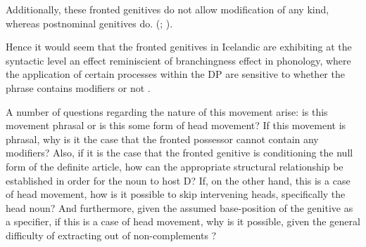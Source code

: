 \documentclass[output=paper,colorlinks,citecolor=brown,
]{langscibook}
\begin{document}
 Additionally, these fronted genitives do not allow modification of any kind, whereas postnominal genitives do. (\citealt{Magnusson:1984ue}; \citealt{OConnor:2013wz}). 

\begin{exe}
	\ex	\cite[101]{Magnusson:1984ue} \label{hardarsoncommons}\vspace{-0.75\baselineskip}
		\begin{xlist}
		\setlength{\columnsep}{-40pt}
		\begin{multicols}{2}
			 \columnbreak
		\end{multicols}
		\end{xlist}
\end{exe}

\noindent Hence it would seem that the fronted genitives in Icelandic are exhibiting at the syntactic level an effect reminiscient of branchingness effect in phonology, where the application of certain processes within the DP are sensitive to whether the phrase contains modifiers or not \citep[for an overview, see, e.g.,][]{Selkirk:2011wv,bonet2019}.

A number of questions regarding the nature of this movement arise: is this movement phrasal or is this some form of head movement? If this movement is phrasal, why is it the case that the fronted possessor cannot contain any modifiers? Also, if it is the case that the fronted genitive is conditioning the null form of the definite article, how can the appropriate structural relationship be established in order for the noun to host D? If, on the other hand, this is a case of head movement, how is it possible to skip intervening heads, specifically the head noun? And furthermore, given the assumed base-position of the genitive as a specifier, if this is a case of head movement, why is it possible, given the general difficulty of extracting out of non-complements \citep[see, e.g.,][]{huang1982}?
\end{document}
